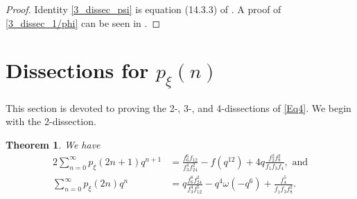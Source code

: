 \documentclass[12pt]{article}
\newtheorem{theorem}{Theorem}[section]
\begin{document}
\begin{proof}
Identity \eqref{3_dissec_psi} is equation (14.3.3) of \cite{H}. A proof of \eqref{3_dissec_1/phi} can be seen in \cite{H-S-1}.
\end{proof}


\section{Dissections for $p_{\xi}(n)$}
\label{sec:ids}

This section is devoted to proving the 2-, 3-, and 4-dissections of \eqref{Eq4}. We begin with the 2-dissection.

\begin{theorem} We have
\begin{align}
2\sum_{n=0}^{\infty} p_{\xi}(2n+1)q^{n+1} & = \frac{f_{6}^6f_{12}}{f_3^4f_{24}^2} - f(q^{12})  +4q\frac{f_2^2f_{8}^2}{f_1f_3f_4}, \textrm{\ \ and} \label{Eq36} \\
\sum_{n=0}^{\infty} p_{\xi}(2n)q^{n} & = q\frac{f_{6}^8f_{24}^2}{f_3^4f_{12}^5} - q^4\omega(-q^{6}) + \frac{f_4^5}{f_1f_3f_{8}^2}. \label{Eq37}
\end{align}
\end{theorem}
\end{document}
